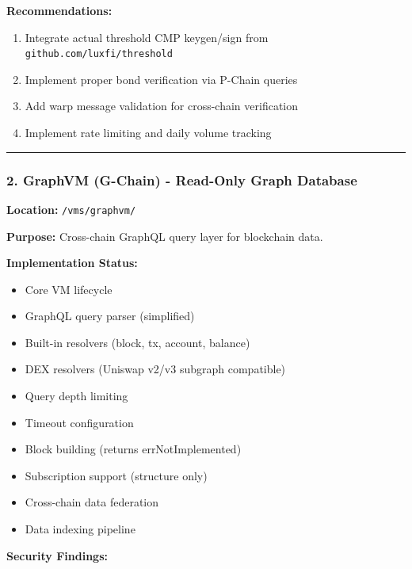 \documentclass[
]{article}
\providecommand{\tightlist}{%
  \setlength{\itemsep}{0pt}\setlength{\parskip}{0pt}}
\begin{document}
\textbf{Recommendations:}

\begin{enumerate}
\def\labelenumi{\arabic{enumi}.}
\tightlist
\item
  Integrate actual threshold CMP keygen/sign from
  \texttt{github.com/luxfi/threshold}
\item
  Implement proper bond verification via P-Chain queries
\item
  Add warp message validation for cross-chain verification
\item
  Implement rate limiting and daily volume tracking
\end{enumerate}

\begin{center}\rule{0.5\linewidth}{0.5pt}\end{center}

\subsubsection{2. GraphVM (G-Chain) - Read-Only Graph
Database}\label{2-graphvm-g-chain---read-only-graph-database}

\textbf{Location:} \texttt{/vms/graphvm/}

\textbf{Purpose:} Cross-chain GraphQL query layer for blockchain data.

\textbf{Implementation Status:}

\begin{itemize}
\tightlist
\item[$\boxtimes$]
  Core VM lifecycle
\item[$\boxtimes$]
  GraphQL query parser (simplified)
\item[$\boxtimes$]
  Built-in resolvers (block, tx, account, balance)
\item[$\boxtimes$]
  DEX resolvers (Uniswap v2/v3 subgraph compatible)
\item[$\boxtimes$]
  Query depth limiting
\item[$\boxtimes$]
  Timeout configuration
\item[$\square$]
  Block building (returns errNotImplemented)
\item[$\square$]
  Subscription support (structure only)
\item[$\square$]
  Cross-chain data federation
\item[$\square$]
  Data indexing pipeline
\end{itemize}

\textbf{Security Findings:}
\end{document}
